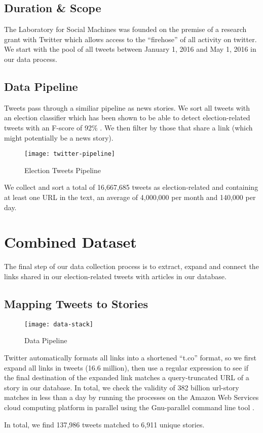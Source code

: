 \subsection{Duration \& Scope} 
The Laboratory for Social Machines was founded on the premise of a research grant with Twitter which allows access to the ``firehose'' of all activity on twitter. We start with the pool of all tweets between January 1, 2016 and May 1, 2016 in our data process.

\subsection{Data Pipeline}

Tweets pass through a similiar pipeline as news stories. We sort all tweets with an election classifier which has been shown to be able to detect election-related tweets with an F-score of 92\% \cite{vijayaraghavan2016automatic}. We then filter by those that share a link (which might potentially be a news story).

\begin{figure}[H]  
\centering 
  \texttt{[image: twitter-pipeline]}  
  \caption{Election Tweets Pipeline
    \label{fig:data-stack-twitter}}
\end{figure} 

We collect and sort a total of 16,667,685 tweets as election-related and containing at least one URL in the text, an average of 4,000,000 per month and 140,000 per day.

\section{Combined Dataset}
The final step of our data collection process is to extract, expand and connect the links shared in our election-related tweets with articles in our database.
 
\subsection{Mapping Tweets to Stories}
\begin{figure}[H]  
\centering 
  \texttt{[image: data-stack]}  
  \caption{Data Pipeline
    \label{fig:data-stack}}
\end{figure}
 
Twitter automatically formats all links into a shortened ``t.co'' format, so we first expand all links in tweets (16.6 million), then use a regular expression to see if the final destination of the expanded link matches a query-truncated URL of a story in our database. In total, we check the validity of 382 billion url-story matches in less than a day by running the processes on the Amazon Web Services cloud computing platform in parallel using the Gnu-parallel command line tool \cite{tange2011gnu}.

In total, we find 137,986 tweets matched to 6,911 unique stories.
 
   